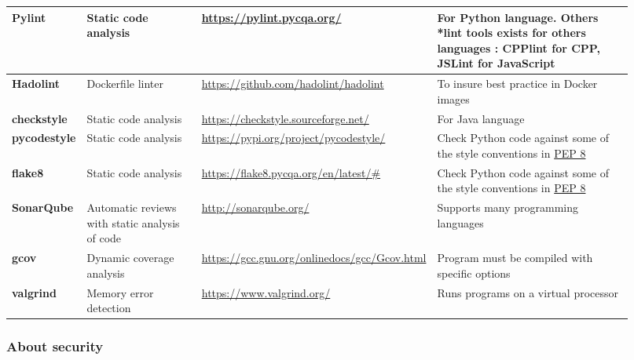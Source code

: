 \begin{center}
    \tabletail{\hline}
    \label{tab:tools_pack}
    \small
    \begin{supertabular}{|p{0.12\linewidth}|p{0.2\linewidth}|p{0.25\linewidth}|p{0.35\linewidth}|} \hline
    \textbf{Pylint} & Static code analysis & \url{https://pylint.pycqa.org/}
    & For Python language. Others *lint tools exists for others
    languages : CPPlint for CPP, JSLint for JavaScript \\ \hline
    \textbf{Hadolint} & Dockerfile linter & \url{https://github.com/hadolint/hadolint}
    & To insure best practice in Docker images \\ \hline
    \textbf{checkstyle} & Static code analysis & \url{https://checkstyle.sourceforge.net/}
    & For Java language  \\ \hline
    \textbf{pycodestyle} & Static code analysis & \url{https://pypi.org/project/pycodestyle/}
    & Check Python code against some of the style conventions in \href{http://www.python.org/dev/peps/pep-0008/}{PEP 8}  \\ \hline
    \textbf{flake8} & Static code analysis & \url{https://flake8.pycqa.org/en/latest/#}
    & Check Python code against some of the style conventions in \href{http://www.python.org/dev/peps/pep-0008/}{PEP 8} \\ \hline
    \textbf{SonarQube} & Automatic reviews with static analysis of code & \url{http://sonarqube.org/}
    & Supports many programming languages  \\ \hline

    \textbf{gcov} & Dynamic coverage analysis & \url{https://gcc.gnu.org/onlinedocs/gcc/Gcov.html}
    & Program must be compiled with specific options  \\ \hline
    \textbf{valgrind} & Memory error detection & \url{https://www.valgrind.org/}
    & Runs programs on a virtual processor  \\ \hline


\end{supertabular}
\end{center}


\subsubsection{About security}

